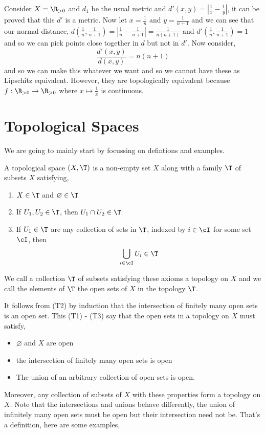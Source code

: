 Consider $X = \R_{>0}$ and $d_1$ be the usual metric and $d'(x, y) = \left| \frac{1}{x} - \frac{1}{y} \right|$, it can be proved that this $d'$ is a metric. Now let $x = \frac{1}{n}$ and $y = \frac{1}{n+1}$ and we can see that our normal distance, $d\left(\frac{1}{n}, \frac{1}{n+1}\right) = \left| \frac{1}{n} - \frac{1}{n+1}\right| = \frac{1}{n(n+1)}$ and $d'\left(\frac{1}{n}, \frac{1}{n+1}\right) = 1$ and so we can pick points close together in $d$ but not in $d'$. Now consider,
$$ \frac{d'(x, y)}{d(x, y)} = n(n+1) $$
and so we can make this whatever we want and so we cannot have these as Lipschitz equivalent. However, they are topologically equivalent because $f : \R_{>0} \to \R_{>0}$ where $x \mapsto \frac{1}{x}$ is continuous.

\section{Topological Spaces}
We are going to mainly start by focussing on defintions and examples.
\begin{ndefi}
  A topological space $(X, \T)$ is a non-empty set $X$ along with a family $\T$ of subsets $X$ satisfying,
  \begin{enumerate}
    \item $X \in \T$ and $\varnothing \in \T$
    \item If $U_1, U_2 \in \T$, then $U_1\cap U_2 \in \T$
    \item If $U_1 \in \T$ are any collection of sets in $\T$, indexed by $i \in \cI$ for some set $\cI$, then
    $$ \bigcup_{i \in \cI} U_i \in \T $$
  \end{enumerate}
  We call a collection $\T$ of subsets satisfying these axioms a topology on $X$ and we call the elements of $\T$ the open sets of $X$ in the topology $\T$.
\end{ndefi}

\noindent
It follows from (T2) by induction that the intersection of finitely many open sets is an open set. This (T1) - (T3) say that the open sets in a topology on $X$ must satisfy,
\begin{itemize}
  \item $\varnothing$ and $X$ are open
  \item the intersection of finitely many open sets is open
  \item The union of an arbitrary collection of open sets is open.
\end{itemize}

\noindent
Moreover, any collection of subsets of $X$ with these properties form a topology on $X$. Note that the intersections and unions behave differently, the union of infinitely many open sets must be open but their intersection need not be. That's a definition, here are some examples,

